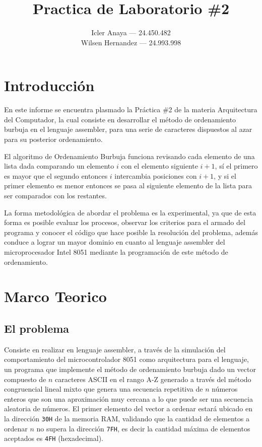 \documentclass[doc, donotrepeattitle, biblatex, apacite]{apa6}
\title{Practica de Laboratorio \#2}
\author{Icler Anaya --- 24.450.482

Wilsen Hernandez --- 24.993.998}
\affiliation{Universidad de Carabobo

Facultad Experimental de Ciencias y Tecnología

Departamento de Computación

Arquitectura del Computador}
\begin{document}
\maketitle
\section{Introducción}
En este informe se encuentra plasmado la Práctica \#2 de la materia Arquitectura del Computador,
la cual consiste en desarrollar el método de ordenamiento burbuja en el lenguaje assembler,
para una serie de caracteres dispuestos al azar para su posterior ordenamiento.

El algoritmo de Ordenamiento Burbuja funciona revisando cada elemento de una lista dada comparando un elemento $i$ 
con el elemento siguiente $i+1$, sí el primero es mayor que el segundo entonces $i$ intercambia posiciones con $i+1$, 
y si el primer elemento es menor entonces se pasa al siguiente elemento 
de la lista para ser comparados con los restantes.

La forma metodológica de abordar el problema es la experimental, ya que de esta forma es posible evaluar los procesos, 
observar los criterios para el armado del programa y conocer el código que hace posible la resolución del problema, 
además conduce a lograr un mayor dominio en cuanto al lenguaje assembler del microprocesador Intel 8051 
mediante la programación de este método de ordenamiento.

\newpage
\section{Marco Teorico}
\subsection{El problema}
Consiste en realizar en lenguaje assembler, a través de la simulación del comportamiento del microcontrolador 8051 como
arquitectura para el lenguaje,  un programa que implemente el método de ordenamiento burbuja dado un vector compuesto de
$n$ caracteres ASCII en el rango A-Z generado a través del método congruencial lineal mixto que genera una secuencia repetitiva de $n$ números enteros que son una aproximación muy cercana a lo que puede ser una secuencia aleatoria de números. El primer elemento del vector a ordenar estará ubicado en la dirección \texttt{30H} de la memoria RAM, validando que la cantidad de elementos a ordenar $n$ no supera la dirección \texttt{7FH}, es decir la cantidad máxima de elementos aceptados es \texttt{4FH} (hexadecimal).
\end{document}

